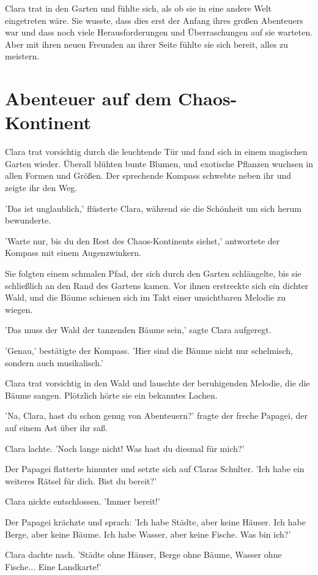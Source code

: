 \documentclass[12pt]{article}
\begin{document}
Clara trat in den Garten und fühlte sich, als ob sie in eine andere Welt eingetreten wäre. Sie wusste, dass dies erst der Anfang ihres großen Abenteuers war und dass noch viele Herausforderungen und Überraschungen auf sie warteten. Aber mit ihren neuen Freunden an ihrer Seite fühlte sie sich bereit, alles zu meistern.

\section{ Abenteuer auf dem Chaos-Kontinent }
 Clara trat vorsichtig durch die leuchtende Tür und fand sich in einem magischen Garten wieder. Überall blühten bunte Blumen, und exotische Pflanzen wuchsen in allen Formen und Größen. Der sprechende Kompass schwebte neben ihr und zeigte ihr den Weg.

'Das ist unglaublich,' flüsterte Clara, während sie die Schönheit um sich herum bewunderte.

'Warte nur, bis du den Rest des Chaos-Kontinents siehst,' antwortete der Kompass mit einem Augenzwinkern.

Sie folgten einem schmalen Pfad, der sich durch den Garten schlängelte, bis sie schließlich an den Rand des Gartens kamen. Vor ihnen erstreckte sich ein dichter Wald, und die Bäume schienen sich im Takt einer unsichtbaren Melodie zu wiegen.

'Das muss der Wald der tanzenden Bäume sein,' sagte Clara aufgeregt.

'Genau,' bestätigte der Kompass. 'Hier sind die Bäume nicht nur schelmisch, sondern auch musikalisch.'

Clara trat vorsichtig in den Wald und lauschte der beruhigenden Melodie, die die Bäume sangen. Plötzlich hörte sie ein bekanntes Lachen.

'Na, Clara, hast du schon genug von Abenteuern?' fragte der freche Papagei, der auf einem Ast über ihr saß.

Clara lachte. 'Noch lange nicht! Was hast du diesmal für mich?'

Der Papagei flatterte hinunter und setzte sich auf Claras Schulter. 'Ich habe ein weiteres Rätsel für dich. Bist du bereit?'

Clara nickte entschlossen. 'Immer bereit!'

Der Papagei krächzte und sprach: 'Ich habe Städte, aber keine Häuser. Ich habe Berge, aber keine Bäume. Ich habe Wasser, aber keine Fische. Was bin ich?'

Clara dachte nach. 'Städte ohne Häuser, Berge ohne Bäume, Wasser ohne Fische... Eine Landkarte!'
\end{document}
